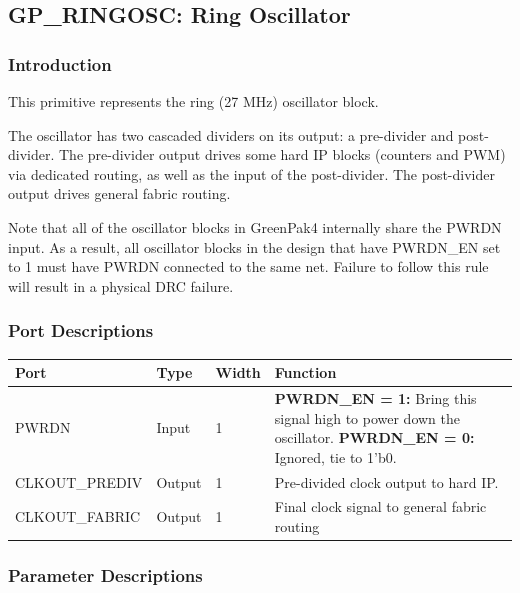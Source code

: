 \documentclass[11pt]{article}
\begin{document}
\pagebreak
\subsection{GP\_RINGOSC: Ring Oscillator}

\subsubsection{Introduction}
This primitive represents the ring (27 MHz) oscillator block.

The oscillator has two cascaded dividers on its output: a pre-divider and post-divider. The pre-divider output drives 
some hard IP blocks (counters and PWM) via dedicated routing, as well as the input of the post-divider. The 
post-divider output drives general fabric routing.

Note that all of the oscillator blocks in GreenPak4 internally share the PWRDN input. As a result, all oscillator 
blocks in the design that have PWRDN\_EN set to 1 must have PWRDN connected to the same net. Failure to follow this 
rule will result in a physical DRC failure.

\subsubsection{Port Descriptions}

\begin{tabularx}{5in}{|l|l|l|X|}
\hline
{\bfseries Port} & {\bfseries Type} & {\bfseries Width} & {\bfseries Function} \\
\hline
PWRDN & Input & 1 &
	{\bfseries PWRDN\_EN = 1:} \newline Bring this signal high to power down the oscillator. \newline
	{\bfseries PWRDN\_EN = 0:} \newline Ignored, tie to 1'b0.\\
\hline
CLKOUT\_PREDIV & Output & 1 & Pre-divided clock output to hard IP.  \\
\hline
CLKOUT\_FABRIC & Output & 1 & Final clock signal to general fabric routing\\
\hline
\end{tabularx}

\subsubsection{Parameter Descriptions}
\end{document}
